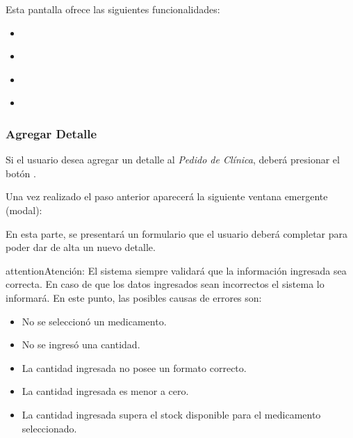 \documentclass[a4paper,10pt,spanish]{sphinxmanual}
\begin{document}
Esta pantalla ofrece las siguientes funcionalidades:
\begin{itemize}
\item {} 
{\hyperref[pedidosclinica:agregar\string-detalle\string-pc]{}}

\item {} 
{\hyperref[pedidosclinica:modificar\string-detalle\string-pc]{}}

\item {} 
{\hyperref[pedidosclinica:eliminar\string-detalle\string-pc]{}}

\item {} 
{\hyperref[pedidosclinica:registrar\string-pedido\string-pc]{}}

\end{itemize}


\subsubsection{Agregar Detalle}
\label{pedidosclinica:agregar-detalle}\label{pedidosclinica:agregar-detalle-pc}
Si el usuario desea agregar un detalle al \emph{Pedido de Clínica}, deberá presionar el botón .


Una vez realizado el paso anterior aparecerá la siguiente ventana emergente (modal):


En esta parte, se presentará un formulario que el usuario deberá completar para poder dar de alta un nuevo detalle.

\begin{notice}{attention}{Atención:}
El sistema siempre validará que la información ingresada sea correcta. En caso de que los datos ingresados sean incorrectos el sistema lo informará.
En este punto, las posibles causas de errores son:
\begin{itemize}
\item {} 
No se seleccionó un medicamento.

\item {} 
No se ingresó una cantidad.

\item {} 
La cantidad ingresada no posee un formato correcto.

\item {} 
La cantidad ingresada es menor a cero.

\item {} 
La cantidad ingresada supera el stock disponible para el medicamento seleccionado.

\end{itemize}
\end{notice}
\end{document}
